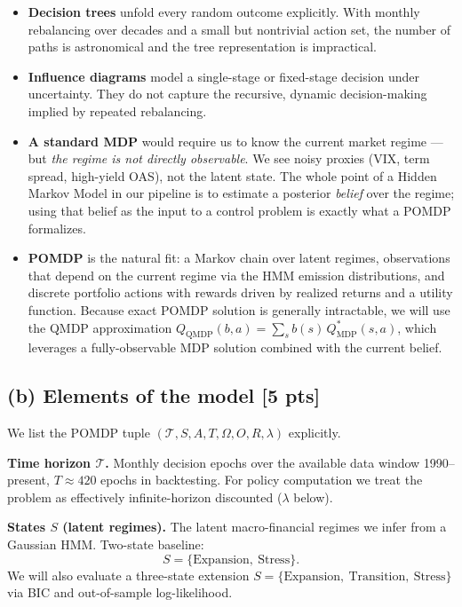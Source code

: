 \documentclass[12pt]{article}
\begin{document}
\begin{itemize}[leftmargin=1.5em,itemsep=2pt]
  \item \textbf{Decision trees} unfold every random outcome explicitly. With monthly rebalancing over decades and a small but nontrivial action set, the number of paths is astronomical and the tree representation is impractical.
  \item \textbf{Influence diagrams} model a single-stage or fixed-stage decision under uncertainty. They do not capture the recursive, dynamic decision-making implied by repeated rebalancing.
  \item \textbf{A standard MDP} would require us to know the current market regime --- but \emph{the regime is not directly observable}. We see noisy proxies (VIX, term spread, high-yield OAS), not the latent state. The whole point of a Hidden Markov Model in our pipeline is to estimate a posterior \emph{belief} over the regime; using that belief as the input to a control problem is exactly what a POMDP formalizes.
  \item \textbf{POMDP} is the natural fit: a Markov chain over latent regimes, observations that depend on the current regime via the HMM emission distributions, and discrete portfolio actions with rewards driven by realized returns and a utility function. Because exact POMDP solution is generally intractable, we will use the QMDP approximation $Q_{\text{QMDP}}(b,a) = \sum_s b(s)\,Q^*_{\text{MDP}}(s,a)$, which leverages a fully-observable MDP solution combined with the current belief.
\end{itemize}

\subsection*{(b) Elements of the model \hfill [5 pts]}

We list the POMDP tuple $(\mathcal{T}, S, A, T, \Omega, O, R, \lambda)$ explicitly.

\textbf{Time horizon $\mathcal{T}$.} Monthly decision epochs over the available data window 1990--present, $T \approx 420$ epochs in backtesting. For policy computation we treat the problem as effectively infinite-horizon discounted ($\lambda$ below).

\textbf{States $S$ (latent regimes).} The latent macro-financial regimes we infer from a Gaussian HMM. Two-state baseline:
\[
  S = \{\text{Expansion},\ \text{Stress}\}.
\]
We will also evaluate a three-state extension $S = \{\text{Expansion},\ \text{Transition},\ \text{Stress}\}$ via BIC and out-of-sample log-likelihood.
\end{document}
